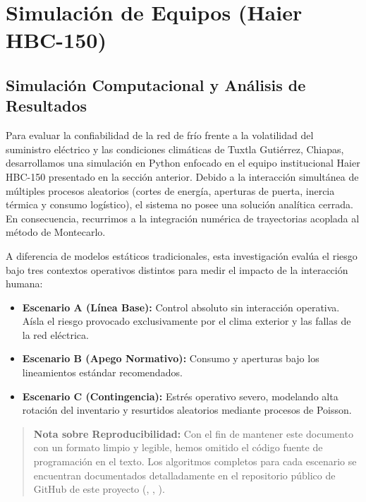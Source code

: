 \documentclass[
  spanish,
  letterpaper,
  DIV=11,
  numbers=noendperiod]{scrreprt}
\providecommand{\tightlist}{%
  \setlength{\itemsep}{0pt}\setlength{\parskip}{0pt}}
\theoremstyle{plain}
\theoremstyle{plain}
\theoremstyle{plain}
\theoremstyle{definition}
\theoremstyle{remark}
\begin{document}
\part{Simulación de Equipos (Haier HBC-150)}

\chapter{Simulación Computacional y Análisis de
Resultados}\label{simulaciuxf3n-computacional-y-anuxe1lisis-de-resultados}

Para evaluar la confiabilidad de la red de frío frente a la volatilidad
del suministro eléctrico y las condiciones climáticas de Tuxtla
Gutiérrez, Chiapas, desarrollamos una simulación en Python enfocado en
el equipo institucional Haier HBC-150 presentado en la sección anterior.
Debido a la interacción simultánea de múltiples procesos aleatorios
(cortes de energía, aperturas de puerta, inercia térmica y consumo
logístico), el sistema no posee una solución analítica cerrada. En
consecuencia, recurrimos a la integración numérica de trayectorias
acoplada al método de Montecarlo.

A diferencia de modelos estáticos tradicionales, esta investigación
evalúa el riesgo bajo tres contextos operativos distintos para medir el
impacto de la interacción humana:

\begin{itemize}
\tightlist
\item
  \textbf{Escenario A (Línea Base):} Control absoluto sin interacción
  operativa. Aísla el riesgo provocado exclusivamente por el clima
  exterior y las fallas de la red eléctrica.
\item
  \textbf{Escenario B (Apego Normativo):} Consumo y aperturas bajo los
  lineamientos estándar recomendados.
\item
  \textbf{Escenario C (Contingencia):} Estrés operativo severo,
  modelando alta rotación del inventario y resurtidos aleatorios
  mediante procesos de Poisson.
\end{itemize}

\begin{quote}
\textbf{Nota sobre Reproducibilidad:} Con el fin de mantener este
documento con un formato limpio y legible, hemos omitido el código
fuente de programación en el texto. Los algoritmos completos para cada
escenario se encuentran documentados detalladamente en el repositorio
público de GitHub de este proyecto
(,
,
).
\end{quote}
\end{document}
